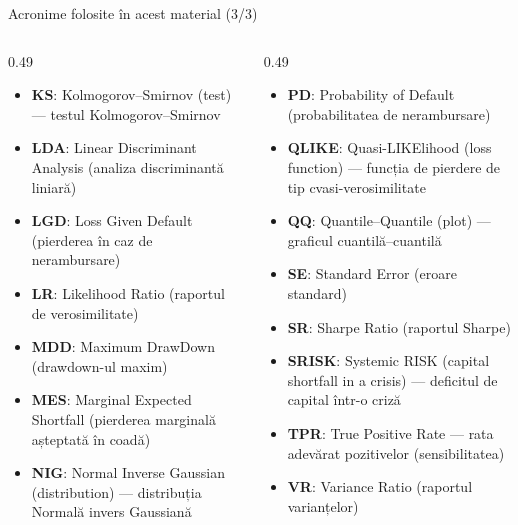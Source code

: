 \begin{frame}{Acronime folosite în acest material (3/3)}
\begin{columns}[T]
\begin{column}{0.49\textwidth}
\begin{itemize}\setlength{\itemsep}{0pt}
    \item \textbf{KS}: Kolmogorov–Smirnov (test) — testul Kolmogorov–Smirnov
    \item \textbf{LDA}: Linear Discriminant Analysis (analiza discriminantă liniară)
    \item \textbf{LGD}: Loss Given Default (pierderea în caz de nerambursare)
    \item \textbf{LR}: Likelihood Ratio (raportul de verosimilitate)
    \item \textbf{MDD}: Maximum DrawDown (drawdown-ul maxim)
    \item \textbf{MES}: Marginal Expected Shortfall (pierderea marginală așteptată în coadă)
    \item \textbf{NIG}: Normal Inverse Gaussian (distribution) — distribuția Normală invers Gaussiană
\end{itemize}
\end{column}
\begin{column}{0.49\textwidth}
\begin{itemize}\setlength{\itemsep}{0pt}
    \item \textbf{PD}: Probability of Default (probabilitatea de nerambursare)
    \item \textbf{QLIKE}: Quasi-LIKElihood (loss function) — funcția de pierdere de tip cvasi-verosimilitate
    \item \textbf{QQ}: Quantile–Quantile (plot) — graficul cuantilă–cuantilă
    \item \textbf{SE}: Standard Error (eroare standard)
    \item \textbf{SR}: Sharpe Ratio (raportul Sharpe)
    \item \textbf{SRISK}: Systemic RISK (capital shortfall in a crisis) — deficitul de capital într-o criză
    \item \textbf{TPR}: True Positive Rate — rata adevărat pozitivelor (sensibilitatea)
    \item \textbf{VR}: Variance Ratio (raportul varianțelor)
\end{itemize}
\end{column}
\end{columns}
\end{frame}

